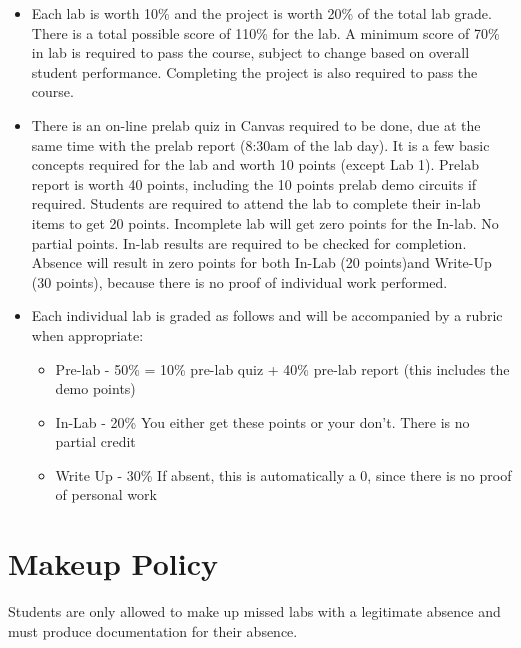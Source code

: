 \begin{itemize}
	\item Each lab is worth 10\% and the project is worth 20\% of the total lab grade. There is a total possible score of 110\% for the lab. A minimum score of 70\% in lab is required to pass the course, subject to change based on overall student performance. Completing the project is also required to pass the course.

	\item There is an on-line prelab quiz in Canvas required to be done, due at the same time with the prelab report (8:30am of the lab day).  It is a few basic concepts required for the lab and worth 10 points (except Lab 1).  Prelab report is worth 40 points, including the 10 points prelab demo circuits if required.  Students are required to attend the lab to complete their in-lab items to get 20 points.  Incomplete lab will get zero points for the In-lab.  No partial points.  In-lab results are required to be checked for completion.
Absence will result in zero points for both In-Lab (20 points)and Write-Up (30 points), because there is no proof of individual work performed.


	\item Each individual lab is graded as follows and will be accompanied by a rubric when appropriate:
		\begin{itemize}
			\item Pre-lab - 50\% = 10\% pre-lab quiz + 40\% pre-lab report (this includes the demo points)
			\item In-Lab - 20\%  You either get these points or your don't. There is no partial credit
			\item Write Up - 30\%  If absent, this is automatically a 0, since there is no proof of personal work
		\end{itemize}
\end{itemize}

\section{Makeup Policy}

Students are only allowed to make up missed labs with a legitimate absence and must produce documentation for their absence.

